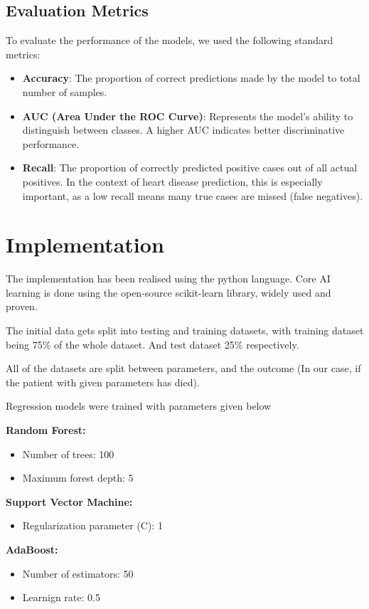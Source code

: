 \documentclass[conference]{IEEEtran}
\begin{document}
\subsection{Evaluation Metrics}
To evaluate the performance of the models, we used the following standard metrics:
\begin{itemize}
    \item \textbf{Accuracy}: The proportion of correct predictions made by the model to total number of samples.
    \item \textbf{AUC (Area Under the ROC Curve)}:  Represents the model’s ability to distinguish between classes. A higher AUC indicates better discriminative performance.
    \item \textbf{Recall}: The proportion of correctly predicted positive cases out of all actual positives. 
    In the context of heart disease prediction, this is especially important, 
    as a low recall means many true cases are missed (false negatives).
\end{itemize}


\section{Implementation}

The implementation has been realised using the python language. Core AI learning
is done using the open-source scikit-learn library, widely used and proven. 

The initial data gets split into testing and training datasets, with training
dataset being 75\% of the whole dataset. And test dataset 25\% respectively.

All of the datasets are split between parameters, and the outcome
(In our case, if the patient with given parameters has died).

Regression models were trained with parameters given below

\textbf{Random Forest:}
\begin{itemize}
    \item Number of trees: 100
    \item Maximum forest depth: 5
\end{itemize}

\textbf{Support Vector Machine:}
\begin{itemize}
    \item Regularization parameter (C): 1
\end{itemize}

\textbf{AdaBoost:}
\begin{itemize}
    \item Number of estimators: 50
    \item Learnign rate: 0.5
\end{itemize}
\end{document}
